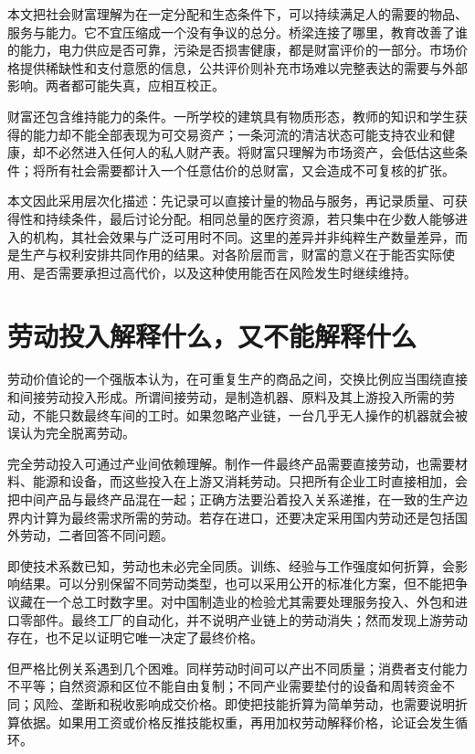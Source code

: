 \documentclass[UTF8,fontset=fandol,zihao=-4,oneside,openany]{ctexbook}
\begin{document}
本文把社会财富理解为在一定分配和生态条件下，可以持续满足人的需要的物品、服务与能力。它不宜压缩成一个没有争议的总分。桥梁连接了哪里，教育改善了谁的能力，电力供应是否可靠，污染是否损害健康，都是财富评价的一部分。市场价格提供稀缺性和支付意愿的信息，公共评价则补充市场难以完整表达的需要与外部影响。两者都可能失真，应相互校正。

\label{arg:P039}
财富还包含维持能力的条件。一所学校的建筑具有物质形态，教师的知识和学生获得的能力却不能全部表现为可交易资产；一条河流的清洁状态可能支持农业和健康，却不必然进入任何人的私人财产表。将财富只理解为市场资产，会低估这些条件；将所有社会需要都计入一个任意估价的总财富，又会造成不可复核的扩张。

本文因此采用层次化描述：先记录可以直接计量的物品与服务，再记录质量、可获得性和持续条件，最后讨论分配。相同总量的医疗资源，若只集中在少数人能够进入的机构，其社会效果与广泛可用时不同。这里的差异并非纯粹生产数量差异，而是生产与权利安排共同作用的结果。对各阶层而言，财富的意义在于能否实际使用、是否需要承担过高代价，以及这种使用能否在风险发生时继续维持。

\section{劳动投入解释什么，又不能解释什么}
劳动价值论的一个强版本认为，在可重复生产的商品之间，交换比例应当围绕直接和间接劳动投入形成。所谓间接劳动，是制造机器、原料及其上游投入所需的劳动，不能只数最终车间的工时。如果忽略产业链，一台几乎无人操作的机器就会被误认为完全脱离劳动。

\label{arg:P040}
完全劳动投入可通过产业间依赖理解。制作一件最终产品需要直接劳动，也需要材料、能源和设备，而这些投入在上游又消耗劳动。只把所有企业工时直接相加，会把中间产品与最终产品混在一起；正确方法要沿着投入关系递推，在一致的生产边界内计算为最终需求所需的劳动。若存在进口，还要决定采用国内劳动还是包括国外劳动，二者回答不同问题。

即使技术系数已知，劳动也未必完全同质。训练、经验与工作强度如何折算，会影响结果。可以分别保留不同劳动类型，也可以采用公开的标准化方案，但不能把争议藏在一个总工时数字里。对中国制造业的检验尤其需要处理服务投入、外包和进口零部件。最终工厂的自动化，并不说明产业链上的劳动消失；然而发现上游劳动存在，也不足以证明它唯一决定了最终价格。

但严格比例关系遇到几个困难。同样劳动时间可以产出不同质量；消费者支付能力不平等；自然资源和区位不能自由复制；不同产业需要垫付的设备和周转资金不同；风险、垄断和税收影响成交价格。即使把技能折算为简单劳动，也需要说明折算依据。如果用工资或价格反推技能权重，再用加权劳动解释价格，论证会发生循环。
\end{document}
